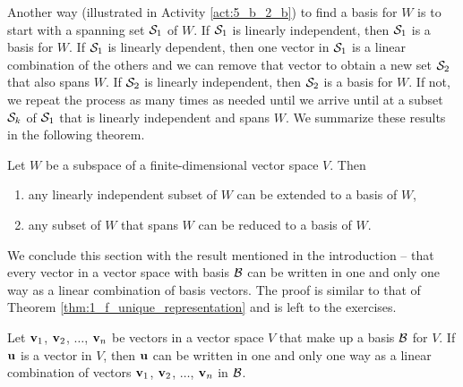 Another way (illustrated in Activity \ref{act:5_b_2_b})  to find a basis for $W$ is to start with a spanning set $\mathcal{S}_1$ of $W$. If $\mathcal{S}_1$ is linearly independent, then $\mathcal{S}_1$ is a basis for $W$. If $\mathcal{S}_1$ is linearly dependent, then one vector in $\mathcal{S}_1$ is a linear combination of the others and we can remove that vector to obtain a new set $\mathcal{S}_2$ that also spans $W$. If $\mathcal{S}_2$ is linearly independent, then $\mathcal{S}_2$ is a basis for $W$. If not, we repeat the process as many times as needed until we arrive until at a subset $\mathcal{S}_k$ of $\mathcal{S}_1$ that is linearly independent and spans $W$. We summarize these results in the following theorem.  

\begin{theorem} Let $W$ be a subspace of a finite-dimensional vector space $V$. Then
\begin{enumerate}
\item any linearly independent subset of $W$ can be extended to a basis of $W$,
\item any subset of $W$ that spans $W$ can be reduced to a basis of $W$.
\end{enumerate}
\end{theorem}


We conclude this section with the result mentioned in the introduction -- that every vector in a vector space with basis $\mathcal{B}$ can be written in one and only one way as a linear combination of basis vectors. The proof is similar to that of Theorem \ref{thm:1_f_unique_representation} and is left to the exercises. 



\begin{theorem} \label{thm:5_b_4} Let $\mathbf{v}_1$, $\mathbf{v}_2$, $\ldots$, $\mathbf{v}_n$ be vectors in a vector space $V$ that make up a basis $\mathcal{B}$ for $V$. If $\mathbf{u}$ is a vector in $V$, then $\mathbf{u}$ can be written in one and only one way as a linear combination of vectors $\mathbf{v}_1$, $\mathbf{v}_2$, $\ldots$, $\mathbf{v}_n$ in $\mathcal{B}$. 
\end{theorem}


\ExampleIntro 

